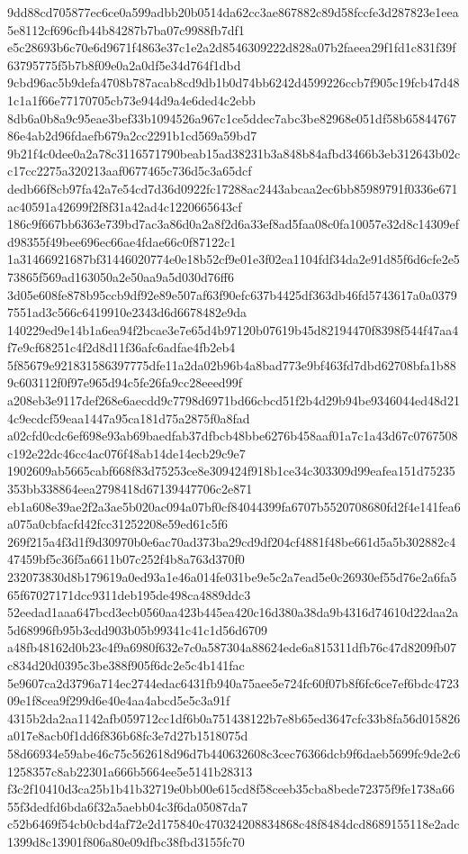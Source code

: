 \documentclass[11pt,a4paper]{article}
\begin{document}
{9dd88cd705877ec6ce0a599adbb20b0514da62cc3ae867882c89d58fccfe3d287823e1eea5e8112cf696cfb44b84287b7ba07c9988fb7df1
e5c28693b6c70e6d9671f4863e37c1e2a2d8546309222d828a07b2faeea29f1fd1c831f39f63795775f5b7b8f09e0a2a0df5e34d764f1dbd
9cbd96ac5b9defa4708b787acab8cd9db1b0d74bb6242d4599226ccb7f905c19fcb47d481c1a1f66e77170705cb73e944d9a4e6ded4c2ebb
8db6a0b8a9c95eae3bef33b1094526a967c1ce5ddec7abc3be82968e051df58b6584476786e4ab2d96fdaefb679a2cc2291b1cd569a59bd7
9b21f4c0dee0a2a78c3116571790beab15ad38231b3a848b84afbd3466b3eb312643b02cc17cc2275a320213aaf0677465c736d5c3a65dcf
dedb66f8cb97fa42a7e54cd7d36d0922fc17288ac2443abcaa2ec6bb85989791f0336e671ac40591a42699f2f8f31a42ad4c1220665643cf
186c9f667bb6363e739bd7ac3a86d0a2a8f2d6a33ef8ad5faa08c0fa10057e32d8c14309efd98355f49bee696ec66ae4fdae66c0f87122c1
1a31466921687bf31446020774e0e18b52cf9e01e3f02ea1104fdf34da2e91d85f6d6cfe2e573865f569ad163050a2e50aa9a5d030d76ff6
3d05e608fe878b95ccb9df92e89e507af63f90efc637b4425df363db46fd5743617a0a03797551ad3c566c6419910e2343d6d6678482e9da
140229ed9e14b1a6ea94f2bcae3e7e65d4b97120b07619b45d82194470f8398f544f47aa4f7e9cf68251c4f2d8d11f36afc6adfae4fb2eb4
5f85679e921831586397775dfe11a2da02b96b4a8bad773e9bf463fd7dbd62708bfa1b889c603112f0f97e965d94c5fe26fa9cc28eeed99f
a208eb3e9117def268e6aecdd9c7798d6971bd66cbcd51f2b4d29b94be9346044ed48d214c9ecdcf59eaa1447a95ca181d75a2875f0a8fad
a02cfd0cdc6ef698e93ab69baedfab37dfbcb48bbe6276b458aaf01a7c1a43d67c0767508c192e22dc46cc4ac076f48ab14de14ecb29c9e7
1902609ab5665cabf668f83d75253ce8e309424f918b1ce34c303309d99eafea151d75235353bb338864eea2798418d67139447706c2e871
eb1a608e39ae2f2a3ae5b020ac094a07bf0cf84044399fa6707b5520708680fd2f4e141fea6a075a0cbfacfd42fcc31252208e59ed61c5f6
269f215a4f3d1f9d30970b0e6ac70ad373ba29cd9df204cf4881f48be661d5a5b302882c447459bf5c36f5a6611b07c252f4b8a763d370f0
232073830d8b179619a0ed93a1e46a014fe031be9e5c2a7ead5e0c26930ef55d76e2a6fa565f67027171dcc9311deb195de498ca4889ddc3
52eedad1aaa647bcd3ecb0560aa423b445ea420c16d380a38da9b4316d74610d22daa2a5d68996fb95b3cdd903b05b99341c41c1d56d6709
a48fb48162d0b23c4f9a6980f632e7c0a587304a88624ede6a815311dfb76c47d8209fb07c834d20d0395c3be388f905f6dc2e5c4b141fac
5e9607ca2d3796a714ec2744edac6431fb940a75aee5e724fc60f07b8f6fc6ce7ef6bdc472309e1f8cea9f299d6e40e4aa4abcd5e5c3a91f
4315b2da2aa1142afb059712cc1df6b0a751438122b7e8b65ed3647cfc33b8fa56d015826a017e8acb0f1dd6f836b68fc3e7d27b1518075d
58d66934e59abe46c75c562618d96d7b440632608c3cec76366dcb9f6daeb5699fc9de2c61258357c8ab22301a666b5664ee5e5141b28313
f3c2f10410d3ca25b1b41b32719e0bb00e615cd8f58ceeb35cba8bede72375f9fe1738a6655f3dedfd6bda6f32a5aebb04c3f6da05087da7
c52b6469f54cb0cbd4af72e2d175840c470324208834868c48f8484dcd8689155118e2adc1399d8c13901f806a80e09dfbc38fbd3155fc70
}
\end{document}
